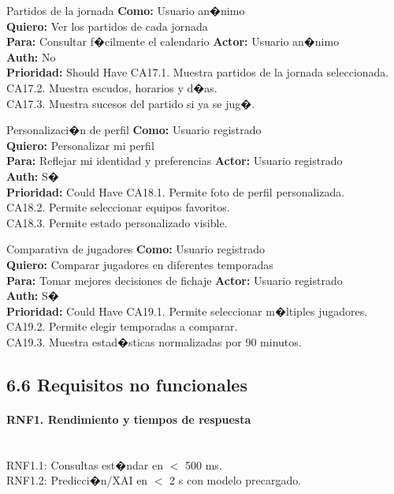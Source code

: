 {Partidos de la jornada}
{\textbf{Como:} Usuario an�nimo\\ \textbf{Quiero:} Ver los partidos de cada jornada\\ \textbf{Para:} Consultar f�cilmente el calendario}
{\textbf{Actor:} Usuario an�nimo\\ \textbf{Auth:} No\\ \textbf{Prioridad:} Should Have}
{CA17.1. Muestra partidos de la jornada seleccionada.\\ CA17.2. Muestra escudos, horarios y d�as.\\ CA17.3. Muestra sucesos del partido si ya se jug�.}

{Personalizaci�n de perfil}
{\textbf{Como:} Usuario registrado\\ \textbf{Quiero:} Personalizar mi perfil\\ \textbf{Para:} Reflejar mi identidad y preferencias}
{\textbf{Actor:} Usuario registrado\\ \textbf{Auth:} S�\\ \textbf{Prioridad:} Could Have}
{CA18.1. Permite foto de perfil personalizada.\\ CA18.2. Permite seleccionar equipos favoritos.\\ CA18.3. Permite estado personalizado visible.}

{Comparativa de jugadores}
{\textbf{Como:} Usuario registrado\\ \textbf{Quiero:} Comparar jugadores en diferentes temporadas\\ \textbf{Para:} Tomar mejores decisiones de fichaje}
{\textbf{Actor:} Usuario registrado\\ \textbf{Auth:} S�\\ \textbf{Prioridad:} Could Have}
{CA19.1. Permite seleccionar m�ltiples jugadores.\\ CA19.2. Permite elegir temporadas a comparar.\\ CA19.3. Muestra estad�sticas normalizadas por 90 minutos.}

\subsection{6.6 Requisitos no funcionales}

\paragraph{RNF1. Rendimiento y tiempos de respuesta}
~\\
RNF1.1: Consultas est�ndar en $<$ 500 ms. \\
RNF1.2: Predicci�n/XAI en $<$ 2 s con modelo precargado.


